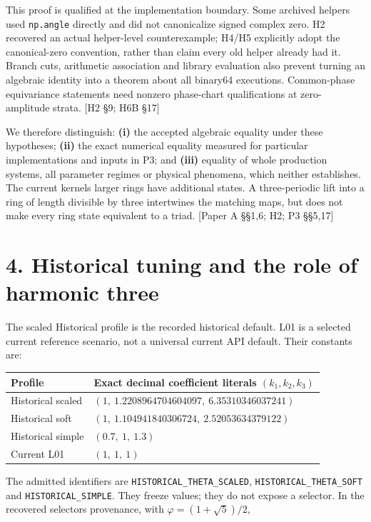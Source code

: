 \documentclass[
  11pt,
  a4paper,
]{article}
\newcounter{none} %
\begin{document}
This proof is qualified at the implementation boundary. Some archived helpers used \texttt{np.angle} directly and did not canonicalize signed complex zero. H2 recovered an actual helper-level counterexample; H4/H5 explicitly adopt the canonical-zero convention, rather than claim every old helper already had it. Branch cuts, arithmetic association and library evaluation also prevent turning an algebraic identity into a theorem about all binary64 executions. Common-phase equivariance statements need nonzero phase-chart qualifications at zero-amplitude strata. {[}H2 §9; H6B §17{]}

We therefore distinguish: \textbf{(i)} the accepted algebraic equality under these hypotheses; \textbf{(ii)} the exact numerical equality measured for particular implementations and inputs in P3; and \textbf{(iii)} equality of whole production systems, all parameter regimes or physical phenomena, which neither establishes. The current kernel\textquotesingle s larger rings have additional states. A three-periodic lift into a ring of length divisible by three intertwines the matching maps, but does not make every ring state equivalent to a triad. {[}Paper A §§1,6; H2; P3 §§5,17{]}

\section{4. Historical tuning and the role of harmonic three}\label{historical-tuning-and-the-role-of-harmonic-three}

The scaled Historical profile is the recorded historical default. L01 is a selected current reference scenario, not a universal current API default. Their constants are:

{\def\LTcaptype{none} %
\begin{longtable}[]{@{}ll@{}}
\toprule\noalign{}
Profile & Exact decimal coefficient literals \((k_1,k_2,k_3)\) \\
\midrule\noalign{}
\endhead
\bottomrule\noalign{}
\endlastfoot
Historical scaled & \((1,\ 1.2208964704604097,\ 6.35310346037241)\) \\
Historical soft & \((1,\ 1.104941840306724,\ 2.52053634379122)\) \\
Historical simple & \((0.7,\ 1,\ 1.3)\) \\
Current L01 & \((1,\ 1,\ 1)\) \\
\end{longtable}
}

The admitted identifiers are \nolinkurl{HISTORICAL_THETA_SCALED}, \nolinkurl{HISTORICAL_THETA_SOFT} and \texttt{HISTORICAL\_SIMPLE}. They freeze values; they do not expose a selector. In the recovered selector\textquotesingle s provenance, with \(\varphi=(1+\sqrt5)/2\),
\end{document}
